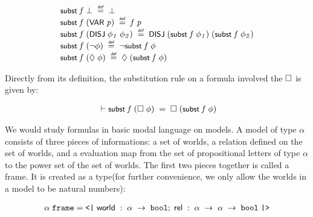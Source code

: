 \documentclass{report}
\renewcommand{\HOLConst}[1]{{\textsf{\upshape\small #1}}}
\renewcommand{\HOLinline}[1]{\ensuremath{#1}}
\newenvironment{holmath}{\begin{displaymath}\begin{array}{l}}{\end{array}\end{displaymath}\ignorespacesafterend}
\begin{document}
\begin{holmath}
\HOLConst{subst}\;\HOLFreeVar{f}\;\HOLSymConst{\ensuremath{\bot}}\;\HOLSymConst{\HOLTokenDefEquality{}}\;\HOLSymConst{\ensuremath{\bot}}\\
\HOLConst{subst}\;\HOLFreeVar{f}\;(\HOLConst{VAR}\;\HOLFreeVar{p})\;\HOLSymConst{\HOLTokenDefEquality{}}\;\HOLFreeVar{f}\;\HOLFreeVar{p}\\
\HOLConst{subst}\;\HOLFreeVar{f}\;(\HOLConst{DISJ}\;\HOLFreeVar{\ensuremath{\phi\sb{1}}}\;\HOLFreeVar{\ensuremath{\phi\sb{2}}})\;\HOLSymConst{\HOLTokenDefEquality{}}\;\HOLConst{DISJ}\;(\HOLConst{subst}\;\HOLFreeVar{f}\;\HOLFreeVar{\ensuremath{\phi\sb{1}}})\;(\HOLConst{subst}\;\HOLFreeVar{f}\;\HOLFreeVar{\ensuremath{\phi\sb{2}}})\\
\HOLConst{subst}\;\HOLFreeVar{f}\;(\HOLSymConst{\HOLTokenNeg{}}\HOLFreeVar{\ensuremath{\phi}})\;\HOLSymConst{\HOLTokenDefEquality{}}\;\HOLSymConst{\HOLTokenNeg{}}\HOLConst{subst}\;\HOLFreeVar{f}\;\HOLFreeVar{\ensuremath{\phi}}\\
\HOLConst{subst}\;\HOLFreeVar{f}\;(\HOLSymConst{\ensuremath{\Diamond}}\;\HOLFreeVar{\ensuremath{\phi}})\;\HOLSymConst{\HOLTokenDefEquality{}}\;\HOLSymConst{\ensuremath{\Diamond}}\;(\HOLConst{subst}\;\HOLFreeVar{f}\;\HOLFreeVar{\ensuremath{\phi}})
\end{holmath}

Directly from its definition, the substitution rule on a formula involved the \HOLinline{\HOLSymConst{\ensuremath{\Box}}} is given by:

\begin{holmath}
  \ensuremath{\HOLTokenTurnstile}\HOLConst{subst}\;\HOLFreeVar{f}\;(\HOLSymConst{\ensuremath{\Box}}\;\HOLFreeVar{\ensuremath{\phi}})\;\HOLSymConst{=}\;\HOLSymConst{\ensuremath{\Box}}\;(\HOLConst{subst}\;\HOLFreeVar{f}\;\HOLFreeVar{\ensuremath{\phi}})
\end{holmath}

We would study formulas in basic modal language on models. A model of type $\alpha$ consists of three pieces of informations: a set of worlds, a relation defined on the set of worlds, and a evaluation map from the set of propositional letters of type $\alpha$ to the power set of the set of worlds. The first two pieces together is called a frame. It is created as a type(for further convenience, we only allow the worlds in a model to be natural numbers):

\begin{holmath}
  \ensuremath{\alpha}\;\HOLTyOp{frame} = \HOLTokenLeftrec{}\;\HOLFieldName{world}\;:\;\ensuremath{\alpha}\;\ensuremath{\rightarrow}\;\HOLTyOp{bool};\;\HOLFieldName{rel}\;:\;\ensuremath{\alpha}\;\ensuremath{\rightarrow}\;\ensuremath{\alpha}\;\ensuremath{\rightarrow}\;\HOLTyOp{bool}\;\HOLTokenRightrec{}
\end{holmath}
\end{document}
